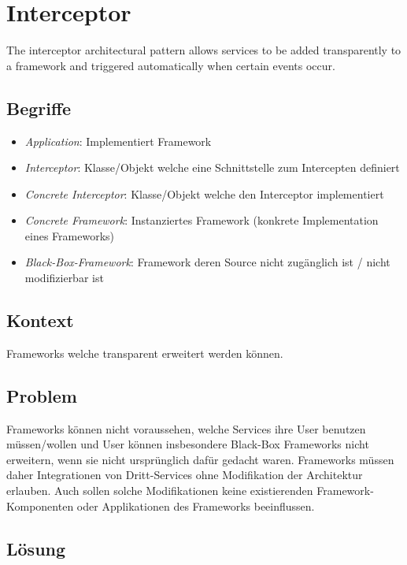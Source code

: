 \section{Interceptor}
\label{sec:interceptor}

The interceptor architectural pattern allows services to be added transparently to a framework and triggered automatically when certain events occur.


\subsection*{Begriffe}

\begin{itemize}
	\item \emph{Application}: Implementiert Framework
	\item \emph{Interceptor}: Klasse/Objekt welche eine Schnittstelle zum Intercepten definiert
	\item \emph{Concrete Interceptor}: Klasse/Objekt welche den Interceptor implementiert
	\item \emph{Concrete Framework}: Instanziertes Framework (konkrete Implementation eines Frameworks)
	\item \emph{Black-Box-Framework}: Framework deren Source nicht zugänglich ist / nicht modifizierbar ist
\end{itemize}


\subsection*{Kontext}

Frameworks welche transparent erweitert werden können.


\subsection*{Problem}

Frameworks können nicht voraussehen, welche Services ihre User benutzen müssen/wollen und User können insbesondere Black-Box Frameworks nicht erweitern, wenn sie nicht ursprünglich dafür gedacht waren.
Frameworks müssen daher Integrationen von Dritt-Services ohne Modifikation der Architektur erlauben. Auch sollen solche Modifikationen keine existierenden Framework-Komponenten oder Applikationen des Frameworks beeinflussen.


\subsection*{Lösung}

